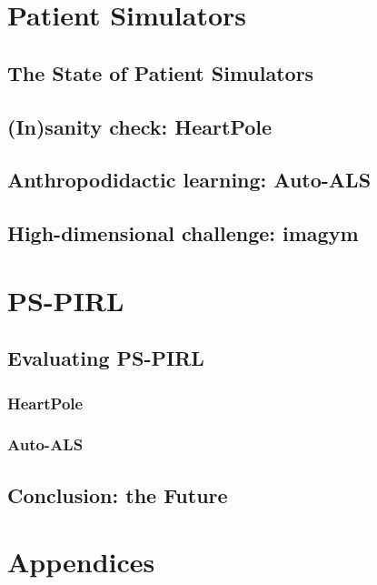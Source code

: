 \part{Patient Simulators}

\newpage
\chapter{The State of Patient Simulators}

\newpage
\chapter{(In)sanity check: HeartPole}

\newpage
\chapter{Anthropodidactic learning: Auto-ALS}

\newpage
\chapter{High-dimensional challenge: imagym}

\newpage


\part{PS-PIRL}

\newpage
\chapter{Evaluating PS-PIRL}\label{ch:seidrforhealth}

\section{HeartPole}

\section{Auto-ALS}

\newpage
\chapter{Conclusion: the Future}

\part{Appendices}

\newpage


\printbibliography


